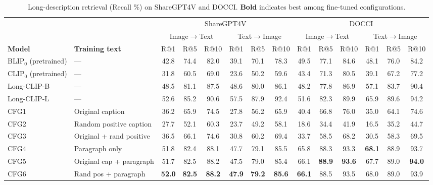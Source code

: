\begin{table}[t]
\centering
\caption{Long-description retrieval (Recall \%) on ShareGPT4V and DOCCI. \textbf{Bold} indicates best among fine-tuned configurations.}
\label{tab:long_description}
\small
\setlength{\tabcolsep}{3.5pt}
\begin{adjustbox}{max width=\textwidth}
\begin{tabular}{llcccccccccccc}
\toprule
 &  & \multicolumn{6}{c}{ShareGPT4V} & \multicolumn{6}{c}{DOCCI} \\
\cmidrule(lr){3-8}
\cmidrule(lr){9-14}
 &  & \multicolumn{3}{c}{Image$\to$Text} & \multicolumn{3}{c}{Text$\to$Image} & \multicolumn{3}{c}{Image$\to$Text} & \multicolumn{3}{c}{Text$\to$Image} \\
\cmidrule(lr){3-5}
\cmidrule(lr){6-8}
\cmidrule(lr){9-11}
\cmidrule(lr){12-14}
\textbf{Model} & \textbf{Training text} & R@1 & R@5 & R@10 & R@1 & R@5 & R@10 & R@1 & R@5 & R@10 & R@1 & R@5 & R@10 \\
\midrule
BLIP$_0$ (pretrained) & --- & 42.8 & 74.4 & 82.0 & 39.1 & 70.1 & 78.3 & 49.5 & 77.1 & 84.6 & 48.1 & 76.0 & 84.2 \\
CLIP$_0$ (pretrained) & --- & 31.8 & 60.5 & 69.0 & 23.6 & 50.2 & 59.6 & 43.4 & 71.3 & 80.5 & 39.1 & 67.2 & 77.2 \\
Long-CLIP-B & --- & 48.5 & 81.1 & 87.5 & 48.6 & 80.0 & 86.1 & 48.2 & 77.8 & 86.9 & 57.1 & 83.7 & 90.4 \\
Long-CLIP-L & --- & 52.6 & 85.2 & 90.6 & 57.5 & 87.9 & 92.4 & 51.6 & 82.3 & 89.9 & 65.9 & 89.6 & 94.2 \\
\midrule
CFG1 & Original caption & 36.2 & 65.9 & 74.5 & 27.8 & 56.2 & 65.9 & 40.4 & 66.8 & 76.0 & 35.0 & 64.1 & 74.6 \\
CFG2 & Random positive caption & 27.7 & 52.1 & 60.3 & 23.7 & 49.2 & 58.1 & 18.6 & 34.4 & 41.9 & 16.5 & 35.2 & 44.7 \\
CFG3 & Original + rand positive & 36.5 & 66.1 & 74.6 & 30.8 & 60.2 & 69.4 & 33.7 & 58.5 & 68.2 & 30.5 & 58.3 & 69.5 \\
CFG4 & Paragraph only & 51.8 & 82.4 & 88.1 & 47.7 & 79.1 & 85.5 & 65.8 & 88.3 & 93.3 & \textbf{68.1} & 88.9 & 93.7 \\
CFG5 & Original cap + paragraph & 51.7 & 82.5 & 88.2 & 47.5 & 79.0 & 85.4 & 66.1 & \textbf{88.9} & \textbf{93.6} & 67.7 & 89.0 & \textbf{94.0} \\
CFG6 & Rand pos + paragraph & \textbf{52.0} & \textbf{82.5} & \textbf{88.2} & \textbf{47.9} & \textbf{79.2} & \textbf{85.6} & \textbf{66.1} & 88.5 & 93.5 & 68.0 & 89.0 & 93.9 \\

\end{tabular}
\end{adjustbox}
\end{table}
